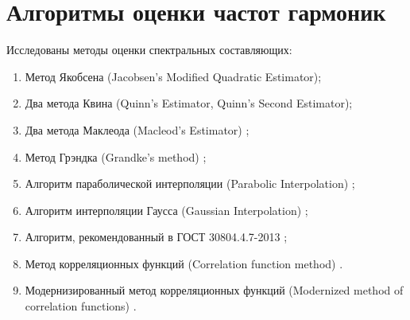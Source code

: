 \section{Алгоритмы оценки частот гармоник} \label{sec:ch2/sec3}
Исследованы методы оценки спектральных составляющих:
\begin{enumerate}
	\item	Метод Якобсена (Jacobsen's Modified Quadratic Estimator)\cite{4205098, jacobsen1994local, jacobsen2007fast, ericjacobsen_cite};
	\item	Два метода Квина (Quinn's Estimator, Quinn's Second Estimator)\cite{558515, 295186, 330402};
	\item	Два метода Маклеода (Macleod's Estimator) \cite{651200, 1055282};
	\item	Метод Грэндка (Grandke's method) \cite{4315077};
	\item	Алгоритм параболической интерполяции (Parabolic Interpolation) \cite{Konopatskiy_2020, LACHANCE1991143, gasior2004improving, 7818824};
	\item	Алгоритм интерполяции Гаусса (Gaussian Interpolation) \cite{gasior2004improving, gu2005leaf, gilboa2014image};
	\item	Алгоритм, рекомендованный в ГОСТ 30804.4.7-2013 \cite{GOST30804.4.7-2013};
	\item	Метод корреляционных функций (Correlation function method) \cite{Altman2012definition, Altman2012promotion, Altman2012improvement, WANG20175}.
	\item Модернизированный метод корреляционных функций (Modernized method of correlation functions) \cite{Altman2012promotion, Elizarov2016analysis, Increase_Accuracy_Yelizarov2014}.
\end{enumerate}




